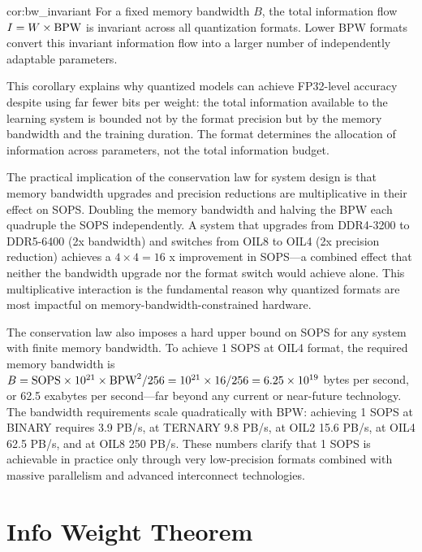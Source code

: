 \begin{mycor}{cor:bw_invariant}
For a fixed memory bandwidth $B$, the total information flow $I = W \times \textnormal{BPW}$ is invariant across all quantization formats. Lower BPW formats convert this invariant information flow into a larger number of independently adaptable parameters.
\end{mycor}

This corollary explains why quantized models can achieve FP32-level accuracy despite using far fewer bits per weight: the total information available to the learning system is bounded not by the format precision but by the memory bandwidth and the training duration. The format determines the allocation of information across parameters, not the total information budget.

The practical implication of the conservation law for system design is that memory bandwidth upgrades and precision reductions are multiplicative in their effect on SOPS. Doubling the memory bandwidth and halving the BPW each quadruple the SOPS independently. A system that upgrades from DDR4-3200 to DDR5-6400 (2x bandwidth) and switches from OIL8 to OIL4 (2x precision reduction) achieves a $4 \times 4 = 16$ x improvement in SOPS---a combined effect that neither the bandwidth upgrade nor the format switch would achieve alone. This multiplicative interaction is the fundamental reason why quantized formats are most impactful on memory-bandwidth-constrained hardware.

The conservation law also imposes a hard upper bound on SOPS for any system with finite memory bandwidth. To achieve 1 SOPS at OIL4 format, the required memory bandwidth is $B = \text{SOPS} \times 10^{21} \times \textnormal{BPW}^2 / 256 = 10^{21} \times 16 / 256 = 6.25 \times 10^{19}$ bytes per second, or 62.5 exabytes per second---far beyond any current or near-future technology. The bandwidth requirements scale quadratically with BPW: achieving 1 SOPS at BINARY requires 3.9 PB/s, at TERNARY 9.8 PB/s, at OIL2 15.6 PB/s, at OIL4 62.5 PB/s, and at OIL8 250 PB/s. These numbers clarify that 1 SOPS is achievable in practice only through very low-precision formats combined with massive parallelism and advanced interconnect technologies.

\section{Info Weight Theorem}
\label{sec:info_weight_theorem}

